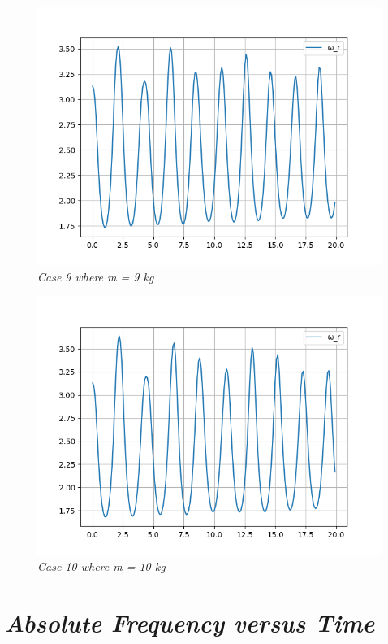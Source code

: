         \begin{figure}[H]
            \centering
            \includegraphics{Appendix/RExpPictures/F/fm9.png}
            \caption{\textit{Case 9 where m = 9 kg}}
            \label{}
        \end{figure}
            
        \begin{figure}[H]
            \centering
            \includegraphics{Appendix/RExpPictures/F/fm10.png}
            \caption{\textit{Case 10 where m = 10 kg}}
            \label{}
        \end{figure}
            
    \section{\textit{Absolute Frequency versus Time}}
            
